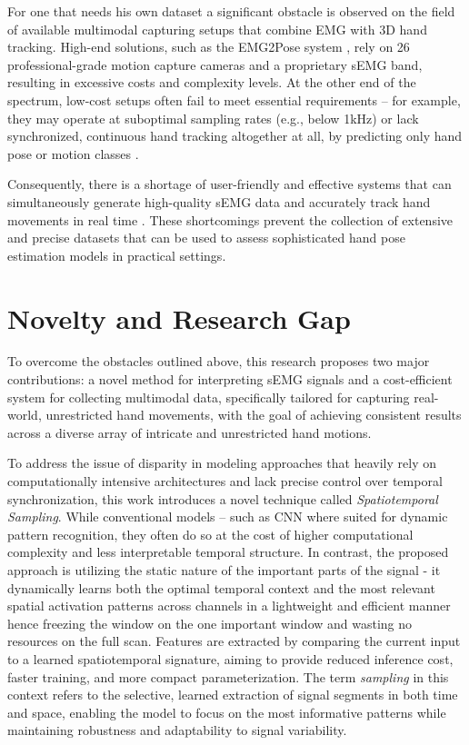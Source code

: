 For one that needs his own dataset a significant obstacle is observed on the field of available multimodal capturing setups that combine EMG with 3D hand tracking. High-end solutions, such as the EMG2Pose system \cite{salter2024emg2pose}, rely on 26 professional-grade motion capture cameras and a proprietary sEMG band, resulting in excessive costs and complexity levels. At the other end of the spectrum, low-cost setups often fail to meet essential requirements -- for example, they may operate at suboptimal sampling rates (e.g., below 1kHz) or lack synchronized, continuous hand tracking altogether at all, by predicting only hand pose or motion classes \cite{nasri2020semg}.

Consequently, there is a shortage of user-friendly and effective systems that can simultaneously generate high-quality sEMG data and accurately track hand movements in real time \cite{graf2023combining}. These shortcomings prevent the collection of extensive and precise datasets that can be used to assess sophisticated hand pose estimation models in practical settings.

\section{Novelty and Research Gap}

To overcome the obstacles outlined above, this research proposes two major contributions: a novel method for interpreting sEMG signals and a cost-efficient system for collecting multimodal data, specifically tailored for capturing real-world, unrestricted hand movements, with the goal of achieving consistent results across a diverse array of intricate and unrestricted hand motions.

To address the issue of disparity in modeling approaches that heavily rely on computationally intensive architectures and lack precise control over temporal synchronization, this work introduces a novel technique called \textit{Spatiotemporal Sampling}. While conventional models -- such as CNN where suited for dynamic pattern recognition, they often do so at the cost of higher computational complexity and less interpretable temporal structure. In contrast, the proposed approach is utilizing the static nature of the important parts of the signal - it dynamically learns both the optimal temporal context and the most relevant spatial activation patterns across channels in a lightweight and efficient manner hence freezing the window on the one important window and wasting no resources on the full scan. Features are extracted by comparing the current input to a learned spatiotemporal signature, aiming to provide reduced inference cost, faster training, and more compact parameterization. The term \textit{sampling} in this context refers to the selective, learned extraction of signal segments in both time and space, enabling the model to focus on the most informative patterns while maintaining robustness and adaptability to signal variability.

